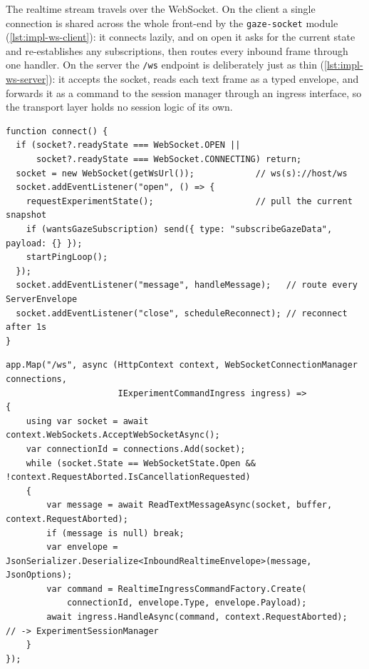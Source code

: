 The realtime stream travels over the WebSocket.
On the client a single connection is shared across the whole front-end by the \texttt{gaze-socket} module (\cref{lst:impl-ws-client}): it connects lazily, and on open it asks for the current state and re-establishes any subscriptions, then routes every inbound frame through one handler.
On the server the \texttt{/ws} endpoint is deliberately just as thin (\cref{lst:impl-ws-server}): it accepts the socket, reads each text frame as a typed envelope, and forwards it as a command to the session manager through an ingress interface, so the transport layer holds no session logic of its own.

\begin{listing}[htbp]
\begin{verbatim}
function connect() {
  if (socket?.readyState === WebSocket.OPEN ||
      socket?.readyState === WebSocket.CONNECTING) return;
  socket = new WebSocket(getWsUrl());            // ws(s)://host/ws
  socket.addEventListener("open", () => {
    requestExperimentState();                    // pull the current snapshot
    if (wantsGazeSubscription) send({ type: "subscribeGazeData", payload: {} });
    startPingLoop();
  });
  socket.addEventListener("message", handleMessage);   // route every ServerEnvelope
  socket.addEventListener("close", scheduleReconnect); // reconnect after 1s
}
\end{verbatim}
\caption{Shared WebSocket client (abbreviated from \texttt{lib/gaze-socket.ts}).}
\label{lst:impl-ws-client}
\end{listing}

\begin{listing}[htbp]
\begin{verbatim}
app.Map("/ws", async (HttpContext context, WebSocketConnectionManager connections,
                      IExperimentCommandIngress ingress) =>
{
    using var socket = await context.WebSockets.AcceptWebSocketAsync();
    var connectionId = connections.Add(socket);
    while (socket.State == WebSocketState.Open && !context.RequestAborted.IsCancellationRequested)
    {
        var message = await ReadTextMessageAsync(socket, buffer, context.RequestAborted);
        if (message is null) break;
        var envelope = JsonSerializer.Deserialize<InboundRealtimeEnvelope>(message, JsonOptions);
        var command = RealtimeIngressCommandFactory.Create(
            connectionId, envelope.Type, envelope.Payload);
        await ingress.HandleAsync(command, context.RequestAborted);  // -> ExperimentSessionManager
    }
});
\end{verbatim}
\caption{Server WebSocket endpoint (abbreviated from \texttt{WebApi/Websockets/WebSocketConfiguration.cs}). No session logic lives in the transport layer.}
\label{lst:impl-ws-server}
\end{listing}

